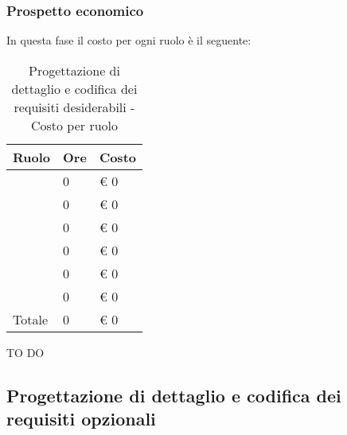 		\subsubsection{Prospetto economico} %
		\label{ssub:prospetto_economico}
		In questa fase il costo per ogni ruolo è il seguente: \\
				\begin{table}[!h]
					\begin{center}
						\begin{tabularx}{0.6\textwidth}{|l|l|X|}
							\hline
							\textbf{Ruolo} & \textbf{Ore} & \textbf{Costo} \\
							\hline
							\roleProjectManager & 0 & \euro{} 0 \\
							\hline
							\roleAnalyst & 0 & \euro{} 0 \\
							\hline
							\roleDesigner & 0 & \euro{} 0 \\
							\hline
							\roleAdministrator & 0 & \euro{} 0 \\
							\hline
							\roleProgrammer & 0 & \euro{} 0 \\
							\hline
							\roleVerifier & 0 & \euro{} 0 \\
							\hline
							Totale & 0 & \euro{} 0 \\
							\hline
						\end{tabularx}
					\end{center}
				\caption{Progettazione di dettaglio e codifica dei requisiti desiderabili - Costo per ruolo}
				\end{table}

			\noindent
			TO DO
		
	
	\subsection{Progettazione di dettaglio e codifica dei requisiti opzionali} %
	\label{sub:progettazione_di_dettaglio_e_codifica_dei_requisiti_opzionali}
